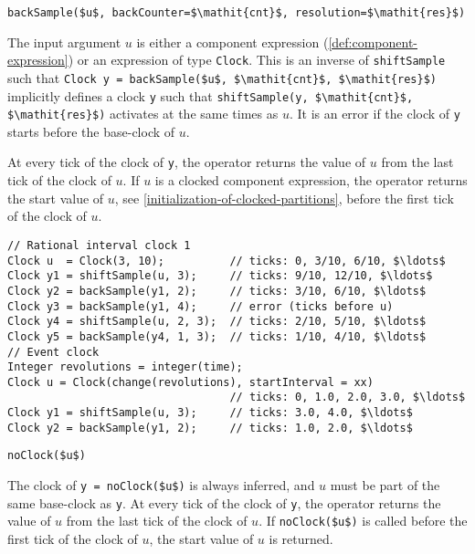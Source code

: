 \begin{operatordefinition}[backSample]
\begin{synopsis}\begin{lstlisting}
backSample($u$, backCounter=$\mathit{cnt}$, resolution=$\mathit{res}$)
\end{lstlisting}\end{synopsis}
\begin{semantics}
The input argument $u$ is either a component expression (\cref{def:component-expression}) or an expression of type \lstinline!Clock!.
This is an inverse of \lstinline!shiftSample! such that \lstinline!Clock y = backSample($u$, $\mathit{cnt}$, $\mathit{res}$)! implicitly defines a clock \lstinline!y! such that \lstinline!shiftSample(y, $\mathit{cnt}$, $\mathit{res}$)! activates at the same times as $u$.
It is an error if the clock of \lstinline!y! starts before the base-clock of $u$.

At every tick of the clock of \lstinline!y!, the operator returns the value of $u$ from the last tick of the clock of $u$.
If $u$ is a clocked component expression, the operator returns the start value of $u$, see \cref{initialization-of-clocked-partitions}, before the first tick of the clock of $u$.

\begin{example}
\begin{lstlisting}[language=modelica]
// Rational interval clock 1
Clock u  = Clock(3, 10);          // ticks: 0, 3/10, 6/10, $\ldots$
Clock y1 = shiftSample(u, 3);     // ticks: 9/10, 12/10, $\ldots$
Clock y2 = backSample(y1, 2);     // ticks: 3/10, 6/10, $\ldots$
Clock y3 = backSample(y1, 4);     // error (ticks before u)
Clock y4 = shiftSample(u, 2, 3);  // ticks: 2/10, 5/10, $\ldots$
Clock y5 = backSample(y4, 1, 3);  // ticks: 1/10, 4/10, $\ldots$
// Event clock
Integer revolutions = integer(time);
Clock u = Clock(change(revolutions), startInterval = xx)
                                  // ticks: 0, 1.0, 2.0, 3.0, $\ldots$
Clock y1 = shiftSample(u, 3);     // ticks: 3.0, 4.0, $\ldots$
Clock y2 = backSample(y1, 2);     // ticks: 1.0, 2.0, $\ldots$
\end{lstlisting}
\end{example}
\end{semantics}
\end{operatordefinition}

\begin{operatordefinition}[noClock]
\begin{synopsis}\begin{lstlisting}
noClock($u$)
\end{lstlisting}\end{synopsis}
\begin{semantics}
The clock of \lstinline!y = noClock($u$)! is always inferred, and $u$ must be part of the same base-clock as \lstinline!y!.
At every tick of the clock of \lstinline!y!, the operator returns the value of $u$ from the last tick of the clock of $u$.
If \lstinline!noClock($u$)! is called before the first tick of the clock of $u$, the start value of $u$ is returned.
\end{semantics}
\end{operatordefinition}

